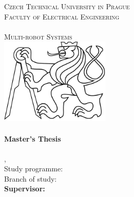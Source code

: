
\begin{titlepage}
  \begin{center}

    \textsc{\Large Czech Technical University in Prague}\\[1em]
    \textsc{\large Faculty of Electrical Engineering\\
    \Department\\
    Multi-robot Systems\\[3em]
    }
    \includegraphics[height=4.1cm]{fig/ctu_lion.pdf}\\[3em]

    \textbf{\textsc{\Huge \Title}}\\[2em]

    \textbf{\Large Master's Thesis}\\[6em]

    \textbf{\huge \Author}\\[6em]

    {\large \Location, \Date}\\[3em]

    Study programme: \Programme\\
    Branch of study: \Field\\[4em]

    \textbf{Supervisor: \Supervisor}\\

    \vspace{2pt}

  \end{center}
\end{titlepage}
